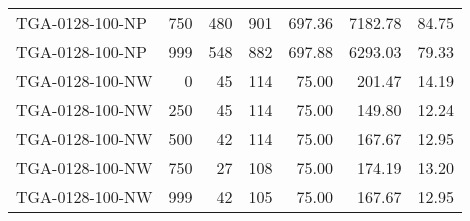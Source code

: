 \begin{table}[htbp]
{\begin{tabular}{lrrrrrr}
    TGA-0128-100-NP & 750    & 480    & 901    & 697.36 & 7182.78 & 84.75 \\
    TGA-0128-100-NP & 999    & 548    & 882    & 697.88 & 6293.03 & 79.33 \\ \hline
    TGA-0128-100-NW & 0      & 45     & 114    & 75.00  & 201.47 & 14.19 \\
    TGA-0128-100-NW & 250    & 45     & 114    & 75.00  & 149.80 & 12.24 \\
    TGA-0128-100-NW & 500    & 42     & 114    & 75.00  & 167.67 & 12.95 \\
    TGA-0128-100-NW & 750    & 27     & 108    & 75.00  & 174.19 & 13.20 \\
    TGA-0128-100-NW & 999    & 42     & 105    & 75.00  & 167.67 & 12.95 \\
    \bottomrule
    \end{tabular}}
  \label{tab:addlabel}%
\end{table}%
